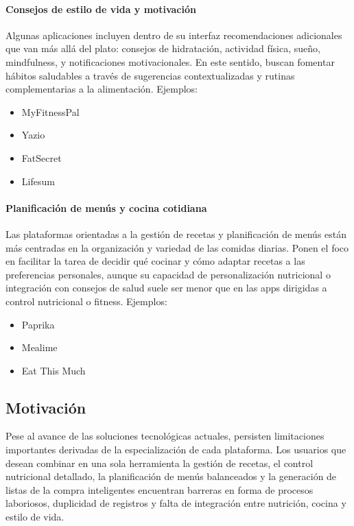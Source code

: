 \paragraph*{Consejos de estilo de vida y motivación}
Algunas aplicaciones incluyen dentro de su interfaz recomendaciones adicionales que van más allá del plato: consejos de hidratación, actividad física, sueño, mindfulness, y notificaciones motivacionales. En este sentido, buscan fomentar hábitos saludables a través de sugerencias contextualizadas y rutinas complementarias a la alimentación. Ejemplos:

\begin{itemize}
  \item MyFitnessPal
  \item Yazio
  \item FatSecret
  \item Lifesum
\end{itemize}

\paragraph*{Planificación de menús y cocina cotidiana}
Las plataformas orientadas a la gestión de recetas y planificación de menús están más centradas en la organización y variedad de las comidas diarias. Ponen el foco en facilitar la tarea de decidir qué cocinar y cómo adaptar recetas a las preferencias personales, aunque su capacidad de personalización nutricional o integración con consejos de salud suele ser menor que en las apps dirigidas a control nutricional o fitness. Ejemplos:

\begin{itemize}
  \item Paprika
  \item Mealime
  \item Eat This Much
\end{itemize}

\subsection*{Motivación}

Pese al avance de las soluciones tecnológicas actuales, persisten limitaciones importantes derivadas de la especialización de cada plataforma. Los usuarios que desean combinar en una sola herramienta la gestión de recetas, el control nutricional detallado, la planificación de menús balanceados y la generación de listas de la compra inteligentes encuentran barreras en forma de procesos laboriosos, duplicidad de registros y falta de integración entre nutrición, cocina y estilo de vida.

